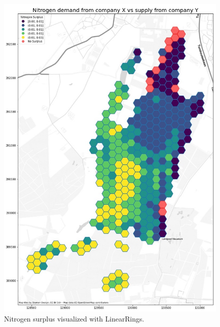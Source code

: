 \documentclass{article}
\begin{document}
\begin{figure}[ht]
    \centering
    \includegraphics[width=\textwidth, height=\textheight, keepaspectratio]{Nitro.jpg}
    \caption{Nitrogen surplus visualized with LinearRings.}
    \label{fig:finalmap}
\end{figure}
\end{document}
